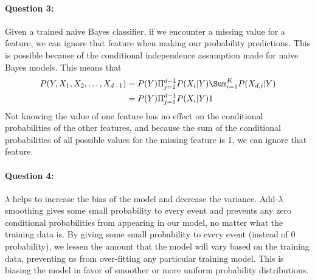 \documentclass[letterpaper,11pt]{article}
\begin{document}
\paragraph{Question 3:}
Given a trained naive Bayes classifier, if we encounter a missing value for a feature, we can ignore that
feature when making our probability predictions. This is possible because of the conditional independence
assumption made for naive Bayes models. This means that
\begin{align}
  P(Y, X_1, X_2, \ldots , X_{d - 1}) & = P(Y) \Pi_{j=1}^{d-1}P(X_i | Y) \Sum_{i=1}^K P(X_{d,i} | Y)\\
                                     & = P(Y) \Pi_{j=1}^{d-1}P(X_i | Y) 1
\end{align}
Not knowing the value of one feature has no effect on the conditional probabilities of the other features,
and because the sum of the conditional probabilities of all possible values for the missing feature is 1,
we can ignore that feature.


\paragraph{Question 4:}
$\lambda$ helps to increase the bias of the model and decrease the variance. Add-$\lambda$ smoothing gives
some small probability to every event and prevents any zero conditional probabilities from appearing in
our model, no matter what the training data is. By giving some small probability
to every event (instead of 0 probability), we lessen the amount that the model will vary based on the
training data, preventing us from over-fitting any particular training model. This is biasing the model in
favor of smoother or more uniform probability distributions.
\end{document}
